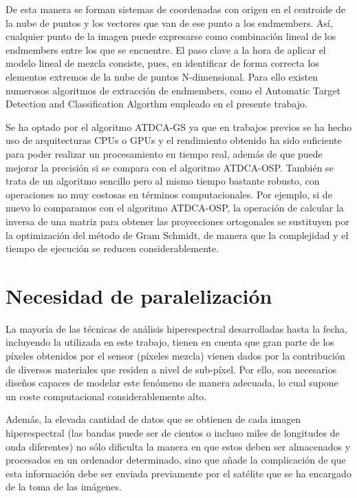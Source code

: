 De esta manera se forman sistemas de coordenadas con origen en el centroide de la nube de puntos y los vectores que van de ese punto a los endmembers. Así, cualquier punto de la imagen puede expresarse como combinación lineal de los endmembers entre los que se encuentre. El paso clave a la hora de aplicar el modelo lineal de mezcla consiste, pues, en identificar de forma correcta los elementos extremos de la nube de puntos N-dimensional. Para ello existen numerosos algoritmos de extracción de endmembers, como el Automatic Target Detection and Classification Algorthm empleado en el presente trabajo.

Se ha optado por el algoritmo ATDCA-GS ya que en trabajos previos se ha hecho uso de arquitecturas CPUs o GPUs y el rendimiento obtenido ha sido suficiente para poder realizar un procesamiento en tiempo real, además de que puede mejorar la precisión si se compara con el algoritmo ATDCA-OSP. También se trata de un algoritmo sencillo pero al mismo tiempo bastante robusto, con operaciones no muy costosas en términos computacionales. Por ejemplo, si de nuevo lo comparamos con el algoritmo ATDCA-OSP, la operación de calcular la inversa de una matriz para obtener las proyecciones ortogonales se sustituyen por la optimización del método de Gram Schmidt, de manera que la complejidad y el tiempo de ejecución se reducen considerablemente.

\section{Necesidad de paralelización}

La mayoría de las técnicas de análisis hiperespectral desarrolladas hasta la fecha, incluyendo la utilizada en este trabajo, tienen en cuenta que gran parte de los píxeles obtenidos por el sensor (píxeles mezcla) vienen dados por la contribución de diversos materiales que residen a nivel de sub-píxel. Por ello, son necesarios diseños capaces de modelar este fenómeno de manera adecuada, lo cual supone un coste computacional considerablemente alto.

Además, la elevada cantidad de datos que se obtienen de cada imagen hiperespectral (las bandas puede ser de cientos o incluso miles de longitudes de onda diferentes) no sólo dificulta la manera en que estos deben ser almacenados y procesados en un ordenador determinado, sino que añade la complicación de que esta información debe ser enviada previamente por el satélite que se ha encargado de la toma de las imágenes.

